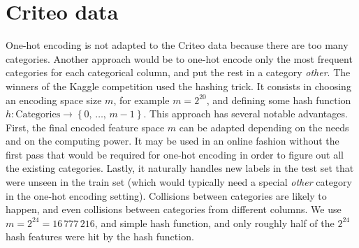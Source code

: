 \section{Criteo data}\label{sec:criteo_data}

One-hot encoding is not adapted to the Criteo data because there are too many categories.
Another approach would be to one-hot encode only the most frequent categories for each categorical column,
and put the rest in a category \textit{other}.
The winners of the Kaggle competition used the hashing trick.
It consists in choosing an encoding space size $m$,
for example $m = 2^{20}$,
and defining some hash function $h \colon \text{Categories} \to \left\{ 0,\, \dots,\, m - 1 \right\}$.
This approach has several notable advantages.
First, the final encoded feature space $m$ can be adapted depending on the needs and on the computing power.
It may be used in an online fashion without the first pass
that would be required for one-hot encoding in order to figure out all the existing categories.
Lastly, it naturally handles new labels in the test set that were unseen in the train set
(which would typically need a special \textit{other} category in the one-hot encoding setting).
Collisions between categories are likely to happen,
and even collisions between categories from different columns.
We use
$m = 2^{24} = 16\,777\,216$,
and simple hash function,
and only roughly half of the $2^{24}$ hash features were hit by the hash function.
